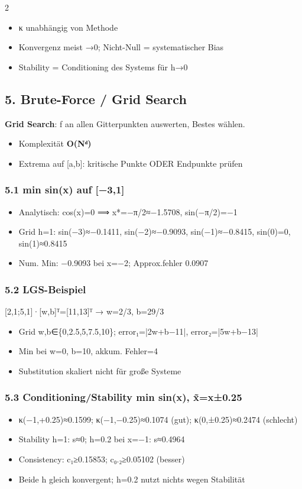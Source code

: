\documentclass[10pt, a4paper]{article}
\begin{document}
\begin{multicols}{2}
\begin{itemize}
  \item κ unabhängig von Methode
  \item Konvergenz meist →0; Nicht-Null = systematischer Bias
  \item Stability = Conditioning des Systems für h→0
\end{itemize}


\subsection{5. Brute-Force / Grid Search}

\textbf{Grid Search}: f an allen Gitterpunkten auswerten, Bestes wählen.

\begin{itemize}
  \item Komplexität \textbf{O(Nᵈ)}
  \item Extrema auf [a,b]: kritische Punkte ODER Endpunkte prüfen
\end{itemize}


\subsubsection{5.1 min sin(x) auf [−3,1]}
\begin{itemize}
  \item Analytisch: cos(x)=0 ⟹ x*=−π/2≈−1.5708, sin(−π/2)=−1
  \item Grid h=1: sin(−3)≈−0.1411, sin(−2)≈−0.9093, sin(−1)≈−0.8415, sin(0)=0, sin(1)≈0.8415
  \item Num. Min: −0.9093 bei x=−2; Approx.fehler 0.0907
\end{itemize}


\subsubsection{5.2 LGS-Beispiel}
[2,1;5,1]·[w,b]ᵀ=[11,13]ᵀ → w=2/3, b=29/3

\begin{itemize}
  \item Grid w,b∈\{0,2.5,5,7.5,10\}; error₁=|2w+b−11|, error₂=|5w+b−13|
  \item Min bei w=0, b=10, akkum. Fehler=4
  \item Substitution skaliert nicht für große Systeme
\end{itemize}


\subsubsection{5.3 Conditioning/Stability min sin(x), x̃=x±0.25}
\begin{itemize}
  \item κ(−1,+0.25)≈0.1599; κ(−1,−0.25)≈0.1074 (gut); κ(0,±0.25)≈0.2474 (schlecht)
  \item Stability h=1: s≈0; h=0.2 bei x=−1: s≈0.4964
  \item Consistency: c₁≥0.15853; c₀.₂≥0.05102 (besser)
  \item Beide h gleich konvergent; h=0.2 nutzt nichts wegen Stabilität
\end{itemize}



\end{multicols}
\end{document}
